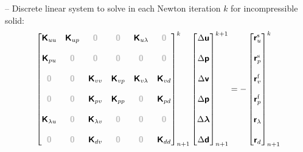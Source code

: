 \documentclass[a4paper,12pt]{report}
\newcommand{\bs}[1]{\boldsymbol{#1}}
\newcommand{\zerom}{\textcolor{lightgray}{\bs{\mathsf{0}}}}
\newcommand{\ROP}{\bs{\mathsf{r}}}
\newcommand{\LM}{\bs{\mathsf{\lambda}}}
\newcommand{\lmi}{\lambda} %
\begin{document}
-- Discrete linear system to solve in each Newton iteration $k$ for incompressible solid:
\begin{equation}
\label{equation-lin-sys-fsi-inc}
\begin{aligned}
\begin{bmatrix} \boldsymbol{\mathsf{K}}_{uu} & \boldsymbol{\mathsf{K}}_{up} & \zerom & \zerom & \boldsymbol{\mathsf{K}}_{u\lmi} & \zerom \\ \\ \boldsymbol{\mathsf{K}}_{pu} & \zerom & \zerom & \zerom & \zerom & \zerom \\ \\ \zerom & \zerom & \boldsymbol{\mathsf{K}}_{vv} & \boldsymbol{\mathsf{K}}_{vp} & \boldsymbol{\mathsf{K}}_{v\lmi} & \boldsymbol{\mathsf{K}}_{vd} \\ \\ \zerom & \zerom & \boldsymbol{\mathsf{K}}_{pv} & \boldsymbol{\mathsf{K}}_{pp} & \zerom & \boldsymbol{\mathsf{K}}_{pd} \\ \\ \boldsymbol{\mathsf{K}}_{\lmi u} & \zerom & \boldsymbol{\mathsf{K}}_{\lmi v} & \zerom & \zerom & \zerom \\ \\ \zerom &  \zerom & \boldsymbol{\mathsf{K}}_{dv}  & \zerom & \zerom & \boldsymbol{\mathsf{K}}_{dd} \end{bmatrix}_{n+1}^{k}\begin{bmatrix} \Delta\boldsymbol{\mathsf{u}} \\ \\ \Delta\boldsymbol{\mathsf{p}} \\ \\ \Delta\boldsymbol{\mathsf{v}} \\ \\ \Delta\boldsymbol{\mathsf{p}} \\ \\ \Delta\LM \\ \\ \Delta\boldsymbol{\mathsf{d}} \end{bmatrix}_{n+1}^{k+1}=-\begin{bmatrix} \ROP_{u}^{\mathrm{s}} \\ \\ \ROP_{p}^{\mathrm{s}} \\ \\ \ROP_{v}^{\mathrm{f}} \\ \\ \ROP_{p}^{\mathrm{f}} \\ \\ \ROP_{\lmi} \\ \\ \ROP_{d}\end{bmatrix}_{n+1}^{k}
\end{aligned}
\end{equation}
\end{document}
